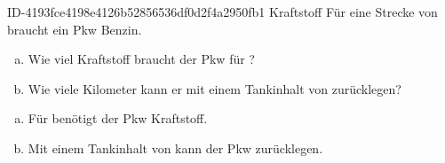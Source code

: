 \begin{exercise}
    {ID-4193fce4198e4126b52856536df0d2f4a2950fb1}
    {Kraftstoff}
\ifproblem\problem
  Für eine Strecke von  braucht ein Pkw  Benzin.
  \begin{enumerate}[a)]
    \item Wie viel Kraftstoff braucht der Pkw für ?
    \item Wie viele Kilometer kann er mit einem Tankinhalt von  zurücklegen?
  \end{enumerate}
\fi
\ifoutcome\outcome
  \begin{enumerate}[a)]
    \item Für  benötigt der Pkw  Kraftstoff.
    \item Mit einem Tankinhalt von  kann der Pkw  zurücklegen.
  \end{enumerate}
\fi
\end{exercise}
